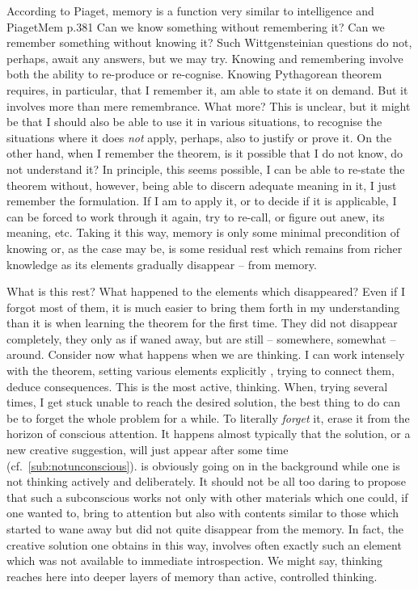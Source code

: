 \pa\label{pa:memovirt} According to Piaget, memory is a function very similar to
intelligence and \citet{the development of memory with age is the history of
  gradual organisations closely dependent on the structuring activities of
  intelligence.}{PiagetMem}{ p.381 } Can we know
something without remembering it? Can we remember something without knowing
it? Such Wittgensteinian questions
do not, perhaps, await any answers, but we may try. Knowing and remembering
involve both the ability to re-produce or re-cognise. Knowing Pythagorean
theorem requires, in particular, that I remember it, am able to state it on
demand. But it involves more than mere remembrance. What more? This is unclear,
but it might be that I should also be able to use it in various situations, to
recognise the situations where it does {\em not} apply, perhaps, also to justify
or prove it.  On the other hand, when I remember the theorem, is it possible
that I do not know, do not understand it? In principle, this seems possible, I
can be able to re-state the theorem without, however, being able to discern
adequate meaning in it, I just remember the formulation. If I am to apply it, or
to decide if it is applicable, I can be forced to work through it again, try to
re-call, or figure out anew, its meaning, etc. Taking it this way, memory is
only some minimal precondition of knowing or, as the case may be, is some
residual rest which remains from richer knowledge as its elements gradually
disappear -- from memory.

\pa
What is this rest? What happened to the elements which disappeared? Even if I
forgot most of them, it is much easier to bring them forth in my understanding
than it is when learning the theorem for the first time. They did not disappear
completely, they only as if waned away, but are still -- somewhere, somewhat --
around. Consider now what happens when we are thinking. I can work intensely
with the theorem, setting various elements explicitly ,
trying to connect them, deduce consequences. This is the most active,
 thinking. When, trying several times, I get stuck unable to reach
the desired solution, the best thing to do can be to forget the whole problem
for a while. To literally {\em forget} it, erase it from the horizon of
conscious attention. It happens almost typically that the solution, or a new
creative suggestion, will just appear after some time
(cf.~\ref{sub:notunconscious}).  is obviously going on in the background
while one is not thinking actively and deliberately. It should not be all too
daring to propose that such a subconscious  works not only with other
materials which one could, if one wanted to, bring to  attention but also with
contents similar to those which started to wane away but did not quite disappear
from the memory. In fact, the creative solution one obtains in this way, involves
often exactly such an element which was not available to immediate
introspection. We might say, thinking reaches here into deeper layers of memory
than active,  controlled thinking.

